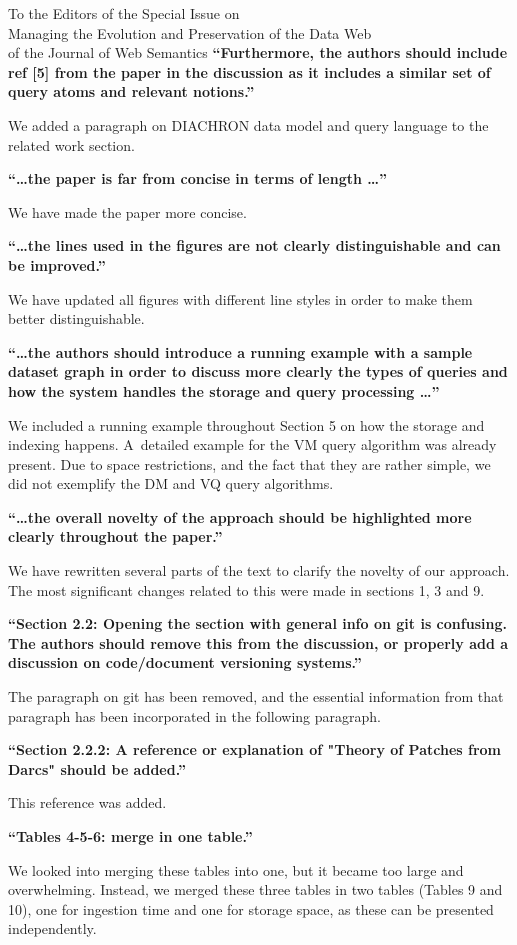 \documentclass{letter}
\newcounter{section}
\begin{document}
\begin{letter}{To the Editors of the Special Issue on\\Managing the Evolution and Preservation of the Data Web\\of the Journal of Web Semantics}
\textbf{\enquote{Furthermore, the authors should include ref [5] from the paper in the discussion as it includes a similar set of query atoms and relevant notions.}}

We added a paragraph on DIACHRON data model and query language to the related work section.

\textbf{\enquote{\ldots the paper is far from concise in terms of length \ldots}}

We have made the paper more concise.

\textbf{\enquote{\ldots the lines used in the figures are not clearly distinguishable and can be improved.}}

We have updated all figures with different line styles in order to make them better distinguishable.

\textbf{\enquote{\ldots the authors should introduce a running example with a sample dataset graph in order to discuss more clearly the types of queries and how the system handles the storage and query processing \ldots}}

We included a running example throughout Section 5 on how the storage and indexing happens.
A~detailed example for the VM query algorithm was already present.
Due to space restrictions, and the fact that they are rather simple, we did not exemplify the DM and VQ query algorithms.

\pagebreak
\textbf{\enquote{\ldots the overall novelty of the approach should be highlighted more clearly throughout the paper.}}

We have rewritten several parts of the text to clarify the novelty of our approach.
The most significant changes related to this were made in sections 1, 3 and 9.

\textbf{\enquote{Section 2.2: Opening the section with general info on git is confusing. The authors should remove this from the discussion, or properly add a discussion on code/document versioning systems.}}

The paragraph on git has been removed, and the essential information from that paragraph has been incorporated in the following paragraph.

\textbf{\enquote{Section 2.2.2: A reference or explanation of "Theory of Patches from Darcs" should be added.}}

This reference was added.

\textbf{\enquote{Tables 4-5-6: merge in one table.}}

We looked into merging these tables into one,
but it became too large and overwhelming.
Instead, we merged these three tables in two tables (Tables 9 and 10),
one for ingestion time and one for storage space, as these can be presented independently.


\end{letter}
\end{document}
